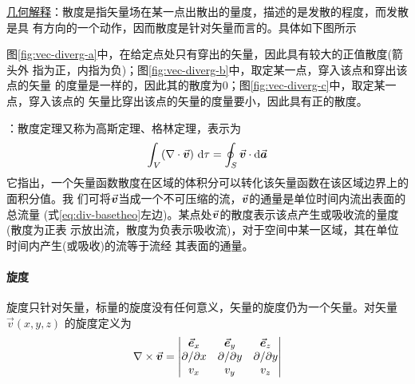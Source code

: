 \uline{几何解释}：散度是指矢量场在某一点出散出的量度，描述的是发散的程度，而发散是具
有方向的一个动作，因而散度是针对矢量而言的。具体如下图所示
\begin{figure}[ht]
    \centering
    \setlength{\abovecaptionskip}{0.2cm}
    \subfloat[]{
        
        \label{fig:vec-diverg-a}
    }
    \hfill
    \subfloat[]{
        
        \label{fig:vec-diverg-b}
    }
    \hfill
    \subfloat[]{
        
        \label{fig:vec-diverg-c}
    }
    \caption{}
    \label{fig:vec-diverg}
\end{figure}
\newline
图\ref{fig:vec-diverg-a}中，在给定点处只有穿出的矢量，因此具有较大的正值散度(箭头外
指为正，内指为负)；图\ref{fig:vec-diverg-b}中，取定某一点，穿入该点和穿出该点的矢量
的度量是一样的，因此其的散度为0；图\ref{fig:vec-diverg-c}中，取定某一点，穿入该点的
矢量比穿出该点的矢量的度量要小，因此具有正的散度。

：散度定理又称为高斯定理、格林定理，表示为
\begin{equation}
    \int_{V} (\nabla \cdot \vec{\bm{v}})\ \mathrm{d} \tau
                         = \oint_{S} \vec{\bm{v}} \cdot \mathrm{d} \vec{\bm{a}}
    \label{eq:div-basetheo}
\end{equation}
它指出，一个矢量函数散度在区域的体积分可以转化该矢量函数在该区域边界上的面积分值。我
们可将$\vec{\bm{v}}$当成一个不可压缩的流，$\vec{\bm{v}}$的通量是单位时间内流出表面的总流量
(式\eqref{eq:div-basetheo}左边)。某点处$\vec{\bm{v}}$的散度表示该点产生或吸收流的量度(散度为正表
示放出流，散度为负表示吸收流)，对于空间中某一区域，其在单位时间内产生(或吸收)的流等于流经
其表面的通量。


\paragraph*{旋度}
旋度只针对矢量，标量的旋度没有任何意义，矢量的旋度仍为一个矢量。对矢量$\vec{v}(x, y, z)$
的旋度定义为
\begin{equation}
    \nabla \times \vec{\bm{v}} = 
    \left|\begin{matrix}
        \vec{\bm{e}}_x               &   \vec{\bm{e}}_y               &   \vec{\bm{e}}_z   \\
        \partial / \partial x   &   \partial / \partial y   &   \partial / \partial y  \\
        v_x                     &   v_y                     &   v_z 
    \end{matrix}\right|
    \label{eq:vec-curl}
\end{equation}

